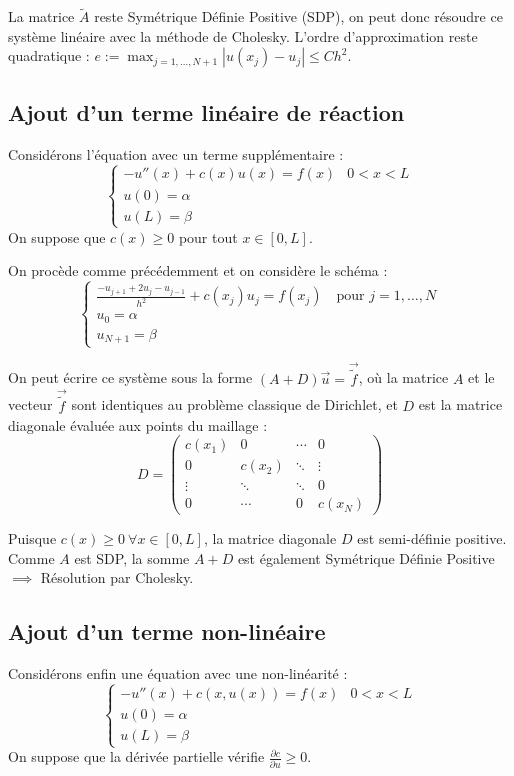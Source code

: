 La matrice $\tilde{A}$ reste Symétrique Définie Positive (SDP), on peut donc résoudre ce système linéaire avec la méthode de Cholesky. L'ordre d'approximation reste quadratique : $e := \max_{j=1, \dots, N+1} |u(x_j) - u_j| \le C h^2$.

\subsection{Ajout d'un terme linéaire de réaction}

Considérons l'équation avec un terme supplémentaire :
$$
\begin{cases}
-u''(x) + c(x)u(x) = f(x) & 0 < x < L \\
u(0) = \alpha & \\
u(L) = \beta &
\end{cases}
$$
On suppose que $c(x) \ge 0$ pour tout $x \in [0, L]$.

On procède comme précédemment et on considère le schéma :
$$
\begin{cases}
\frac{-u_{j+1} + 2u_j - u_{j-1}}{h^2} + c(x_j)u_j = f(x_j) \quad \text{pour } j=1, \dots, N \\
u_0 = \alpha \\
u_{N+1} = \beta
\end{cases}
$$

On peut écrire ce système sous la forme $(A + D)\vec{u} = \vec{\tilde{f}}$, où la matrice $A$ et le vecteur $\vec{\tilde{f}}$ sont identiques au problème classique de Dirichlet, et $D$ est la matrice diagonale évaluée aux points du maillage :
$$
D = \begin{pmatrix}
c(x_1) & 0 & \cdots & 0 \\
0 & c(x_2) & \ddots & \vdots \\
\vdots & \ddots & \ddots & 0 \\
0 & \cdots & 0 & c(x_N)
\end{pmatrix}
$$

Puisque $c(x) \ge 0 \ \forall x \in [0,L]$, la matrice diagonale $D$ est semi-définie positive. Comme $A$ est SDP, la somme $A + D$ est également Symétrique Définie Positive $\implies$ Résolution par Cholesky.

\subsection{Ajout d'un terme non-linéaire}

Considérons enfin une équation avec une non-linéarité :
$$
\begin{cases}
-u''(x) + c(x, u(x)) = f(x) & 0 < x < L \\
u(0) = \alpha & \\
u(L) = \beta &
\end{cases}
$$
On suppose que la dérivée partielle vérifie $\frac{\partial c}{\partial u} \ge 0$.

